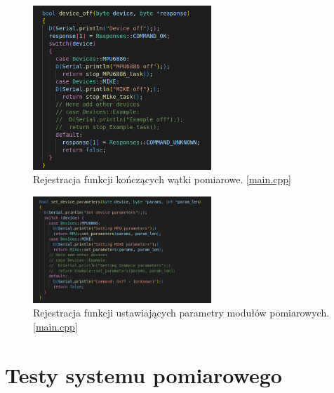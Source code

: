 \documentclass[12pt,oneside,a4paper]{book}
\theoremstyle{break}
\begin{document}
\begin{figure}[H]
    \begin{center}
        \includegraphics[width=0.6\textwidth]{uc-dev-off}
        \caption{Rejestracja funkcji kończących wątki pomiarowe. \ref*{main.cpp}}
        \label{rys:uc-dev-off}
    \end{center}
\end{figure}

\begin{figure}[H] 
    \begin{center}
        \includegraphics[width=0.6\textwidth]{uc-dev-set}
        \caption{Rejestracja funkcji ustawiających parametry modułów pomiarowych. \ref*{main.cpp}}
        \label{rys:uc-dev-set}
    \end{center}
\end{figure}

\chapter{Testy systemu pomiarowego}
\end{document}
